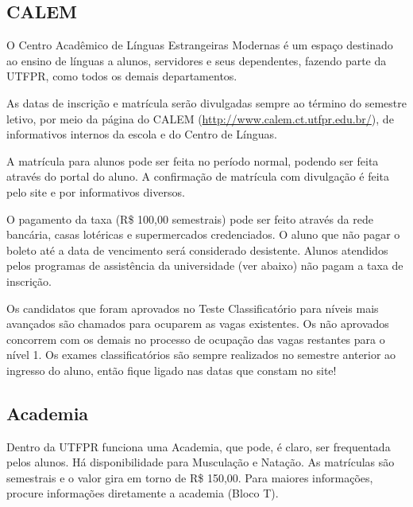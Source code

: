 \documentclass[a4paper,12pt,openany]{article}
\begin{document}

\subsection{CALEM}

O Centro Acadêmico de Línguas Estrangeiras Modernas é um espaço destinado ao ensino de línguas a alunos, servidores e seus dependentes,  fazendo parte da UTFPR, como todos os demais departamentos.

As datas de inscrição e matrícula serão divulgadas sempre ao término do semestre letivo, por meio da página do CALEM (\url{http://www.calem.ct.utfpr.edu.br/}), de informativos internos da escola e do Centro de Línguas.

A matrícula para alunos pode ser feita no período normal, podendo ser feita através do portal do aluno. A confirmação de matrícula com divulgação é feita pelo site e por informativos diversos.

O pagamento da taxa (R\$ 100,00 semestrais) pode ser feito através da rede bancária, casas lotéricas e supermercados credenciados. O aluno que não pagar o boleto até a data de vencimento será considerado desistente. Alunos atendidos pelos programas de assistência da universidade (ver abaixo) não pagam a taxa de inscrição.

Os candidatos que foram aprovados no Teste Classificatório para níveis mais avançados são chamados para ocuparem as vagas existentes. Os não aprovados concorrem com os demais no processo de ocupação das vagas restantes para o nível 1. Os exames classificatórios são sempre realizados no semestre anterior ao ingresso do aluno, então fique ligado nas datas que constam no site!




\subsection{Academia}

Dentro da UTFPR funciona uma Academia, que pode, é claro, ser frequentada pelos alunos. Há disponibilidade para Musculação e Natação. As matrículas são semestrais e o valor gira em torno de R\$ 150,00. Para maiores informações, procure informações diretamente a academia (Bloco T).


\end{document}
